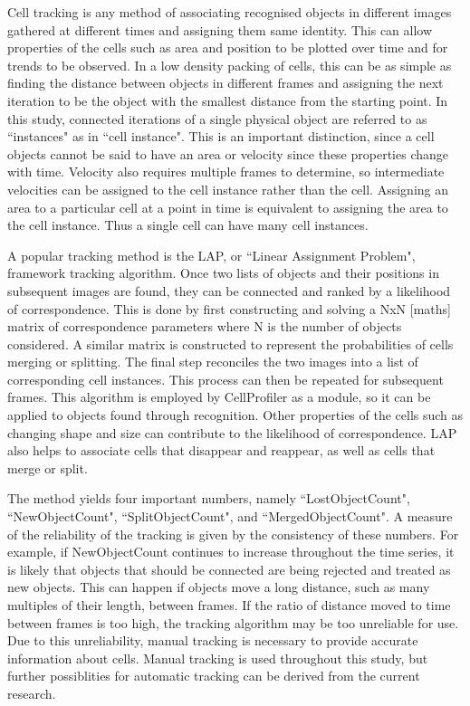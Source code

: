 Cell tracking is any method of associating recognised objects in different images gathered at different times and assigning them same identity. This can allow properties of the cells such as area and position to be plotted over time and for trends to be observed. In a low density packing of cells, this can be as simple as finding the distance between objects in different frames and assigning the next iteration to be the object with the smallest distance from the starting point. In this study, connected iterations of a single physical object are referred to as ``instances" as in ``cell instance". This is an important distinction, since a cell objects cannot be said to have an area or velocity since these properties change with time. Velocity also requires multiple frames to determine, so intermediate velocities can be assigned to the cell instance rather than the cell. Assigning an area to a particular cell at a point in time is equivalent to assigning the area to the cell instance. Thus a single cell can have many cell instances.

A popular tracking method is the LAP, or ``Linear Assignment Problem", framework tracking algorithm. Once two lists of objects and their positions in subsequent images are found, they can be connected and ranked by a likelihood of correspondence. This is done by first constructing and solving a NxN [maths] matrix of correspondence parameters where N is the number of objects considered. A similar matrix is constructed to represent the probabilities of cells merging or splitting. The final step reconciles the two images into a list of corresponding cell instances. This process can then be repeated for subsequent frames. This algorithm is employed by CellProfiler as a module, so it can be applied to objects found through recognition. Other properties of the cells such as changing shape and size can contribute to the likelihood of correspondence. LAP also helps to associate cells that disappear and reappear, as well as cells that merge or split.

The method yields four important numbers, namely ``LostObjectCount", ``NewObjectCount", ``SplitObjectCount", and ``MergedObjectCount". A measure of the reliability of the tracking is given by the consistency of these numbers. For example, if NewObjectCount continues to increase throughout the time series, it is likely that objects that should be connected are being rejected and treated as new objects. This can happen if objects move a long distance, such as many multiples of their length, between frames. If the ratio of distance moved to time between frames is too high, the tracking algorithm may be too unreliable for use. Due to this unreliability, manual tracking is necessary to provide accurate information about cells. Manual tracking is used throughout this study, but further possiblities for automatic tracking can be derived from the current research.

